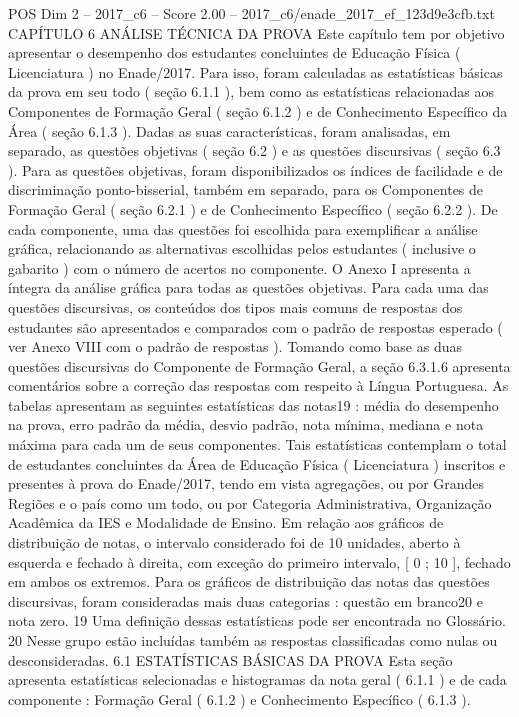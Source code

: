 \begin{textsample}{POS Dim 2 – 2017\_c6 – Score 2.00 – 2017\_c6/enade\_2017\_ef\_123d9e3cfb.txt}  \label{ex:f2_pos_266}
CAPÍTULO 6 ANÁLISE TÉCNICA DA PROVA Este capítulo tem por objetivo apresentar o desempenho dos estudantes concluintes de Educação Física ( Licenciatura ) no Enade/2017.
Para isso, foram calculadas as estatísticas básicas da prova em seu todo ( seção 6.1.1 ), bem como as estatísticas relacionadas aos Componentes de Formação Geral ( seção 6.1.2 ) e de Conhecimento Específico da Área ( seção 6.1.3 ).
Dadas as suas características, foram analisadas, em separado, as questões objetivas ( seção 6.2 ) e as questões discursivas ( seção 6.3 ).
Para as questões objetivas, foram disponibilizados os índices de facilidade e de discriminação ponto-bisserial, também em separado, para os Componentes de Formação Geral ( seção 6.2.1 ) e de Conhecimento Específico ( seção 6.2.2 ).
De cada componente, uma das questões foi escolhida para exemplificar a análise gráfica, relacionando as alternativas escolhidas pelos estudantes ( inclusive o gabarito ) com o número de acertos no componente.
O Anexo I apresenta a íntegra da análise gráfica para todas as questões objetivas.
Para cada uma das questões discursivas, os conteúdos dos tipos mais comuns de respostas dos estudantes são apresentados e comparados com o padrão de respostas esperado ( ver Anexo VIII com o padrão de respostas ).
Tomando como base as duas questões discursivas do Componente de Formação Geral, a seção 6.3.1.6 apresenta comentários sobre a correção das respostas com respeito à Língua Portuguesa.
As tabelas apresentam as seguintes estatísticas das notas19 : média do desempenho na prova, erro padrão da média, desvio padrão, nota mínima, mediana e nota máxima para cada um de seus componentes.
Tais estatísticas contemplam o total de estudantes concluintes da Área de Educação Física ( Licenciatura ) inscritos e presentes à prova do Enade/2017, tendo em vista agregações, ou por Grandes Regiões e o país como um todo, ou por Categoria Administrativa, Organização Acadêmica da IES e Modalidade de Ensino.
Em relação aos gráficos de distribuição de notas, o intervalo considerado foi de 10 unidades, aberto à esquerda e fechado à direita, com exceção do primeiro intervalo, [ 0 ; 10 ], fechado em ambos os extremos.
Para os gráficos de distribuição das notas das questões discursivas, foram consideradas mais duas categorias : questão em branco20 e nota zero. 19 Uma definição dessas estatísticas pode ser encontrada no Glossário. 20 Nesse grupo estão incluídas também as respostas classificadas como nulas ou desconsideradas. 6.1 ESTATÍSTICAS BÁSICAS DA PROVA Esta seção apresenta estatísticas selecionadas e histogramas da nota geral ( 6.1.1 ) e de cada componente : Formação Geral ( 6.1.2 ) e Conhecimento Específico ( 6.1.3 ).

\end{textsample}
